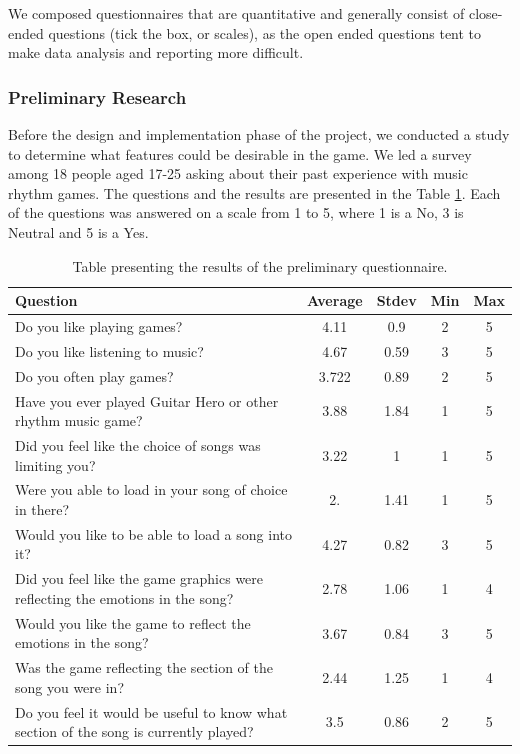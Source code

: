 We composed questionnaires that are quantitative and generally consist of close-ended questions (tick the box, or scales), as the open ended questions tent to make data analysis and reporting more difficult.

\subsubsection*{Preliminary Research}

Before the design and implementation phase of the project, we conducted a study to determine what features could be desirable in the game. We led a survey among 18 people aged 17-25 asking about their past experience with music rhythm games. 
The questions and the results are presented in the Table \ref{table:preliminaryquestions}. Each of the questions was answered on a scale from 1 to 5, where 1 is a No,  3 is Neutral and 5 is a Yes.

\begin{table}
\begin{center}
\begin{tabular}{| p{8cm} | c | c | c | c | } 																								      \hline 
\textbf{Question} & \textbf{Average} & \textbf{Stdev} & \textbf{Min} & \textbf{Max} 						   \\ \hline \hline
Do you like playing games? & 4.11 & 0.9 & 2 & 5		 					 					 									\\ \hline 
Do you like listening to music? & 4.67 & 0.59 & 3 & 5		 					 					 								\\ \hline 
Do you often play games? & 3.722 & 0.89 & 2 & 5 		 					 					 								\\ \hline 
Have you ever played Guitar Hero or other rhythm music game? & 3.88 & 1.84  & 1 & 5							\\ \hline 
Did you feel like the choice of songs was limiting you? & 3.22 & 1 & 1 & 5 					 							\\ \hline 
Were you able to load in your song of choice in there? & 2. & 1.41 & 1 & 5 					 							\\ \hline 
Would you like to be able to load a song into it? & 4.27 & 0.82 & 3 & 5 				 									\\ \hline 
Did you feel like the game graphics were reflecting the emotions in the song? & 2.78 & 1.06 & 1 & 4 			\\ \hline 
Would you like the game to reflect the emotions in the song? & 3.67 & 0.84 & 3 & 5 	 								\\ \hline 
Was the game reflecting the section of the song you were in? & 2.44 & 1.25 & 1 & 4  								\\ \hline 
Do you feel it would be useful to know what section of the song is currently played? & 3.5 & 0.86 & 2 & 5  	\\ \hline 
\end{tabular}
\caption{Table presenting the results of the preliminary questionnaire.}
\label{table:preliminaryquestions}
\end{center}
\end{table}

